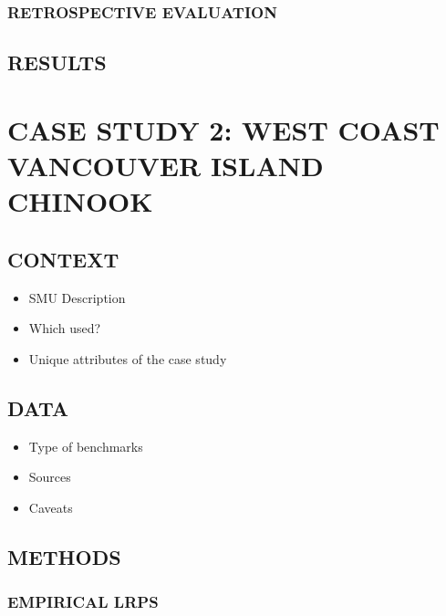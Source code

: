 \documentclass[11pt]{book}
\begin{document}
\hypertarget{retrospective-evaluation}{%
\subsubsection{RETROSPECTIVE EVALUATION}\label{retrospective-evaluation}}

\hypertarget{results}{%
\subsection{RESULTS}\label{results}}

\hypertarget{case-study-2-west-coast-vancouver-island-chinook}{%
\section{CASE STUDY 2: WEST COAST VANCOUVER ISLAND CHINOOK}\label{case-study-2-west-coast-vancouver-island-chinook}}

\hypertarget{context-1}{%
\subsection{CONTEXT}\label{context-1}}
\begin{itemize}

\item
  SMU Description
\item
  Which used?
\item
  Unique attributes of the case study
\end{itemize}
\hypertarget{data-1}{%
\subsection{DATA}\label{data-1}}
\begin{itemize}

\item
  Type of benchmarks
\item
  Sources
\item
  Caveats
\end{itemize}
\hypertarget{methods-1}{%
\subsection{METHODS}\label{methods-1}}

\hypertarget{empirical-lrps-1}{%
\subsubsection{EMPIRICAL LRPS}\label{empirical-lrps-1}}
\end{document}
